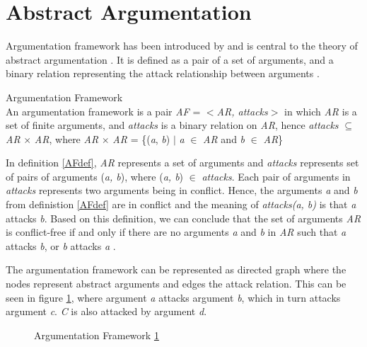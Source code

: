 \section{Abstract Argumentation} \label{abstractArgumentation}
Argumentation framework has been introduced by \citet{dung1995} and is central to the theory of abstract argumentation \citep{baroni2011introduction}. It is defined as a pair of a set of arguments, and a binary relation representing the attack relationship between arguments \citep{dung1995}. 

\theoremstyle{definition}
\begin{definition}{Argumentation Framework}
\label{AFdef}\\
An argumentation framework is a pair \textit{AF} = $<$\textit{AR, attacks}$>$ in which \textit{AR} is a set of finite arguments, and \textit{attacks} is a binary relation on \textit{AR}, hence \textit{attacks} $\subseteq$ \textit{AR} $\times$ \textit{AR}, where \textit{AR} $\times$ \textit{AR} = \{(\textit{a}, \textit{b}) $\vert$ \textit{a} $\in$ \textit{AR} and \textit{b} $\in$ \textit{AR}\}
\end{definition}

In definition \ref{AFdef}, \textit{AR} represents a set of arguments and \textit{attacks} represents set of pairs of arguments (\textit{a, b}), where (\textit{a, b}) $\in$ \textit{attacks}. Each pair of arguments in \textit{attacks} represents two arguments being in conflict. Hence, the arguments \textit{a} and \textit{b} from definistion \ref{AFdef} are in conflict and the meaning of \textit{attacks(a, b)} is that \textit{a} attacks \textit{b}. Based on this definition, we can conclude that the set of arguments \textit{AR} is conflict-free if and only if there are no arguments \textit{a} and \textit{b} in \textit{AR} such that \textit{a} attacks \textit{b}, or \textit{b} attacks \textit{a} \citep{dung1995}.

The argumentation framework can be represented as directed graph where the nodes represent abstract arguments and edges the attack relation. This can be seen in figure \ref{fig:argumentationFrameworkFigure}, where argument \textit{a} attacks argument \textit{b}, which in turn attacks argument \textit{c}. \textit{C} is also attacked by argument \textit{d}.
\newpage
\begin{figure}[h]
\centering
{}
\caption{Argumentation Framework \ref{fig:argumentationFrameworkFigure}}
\label{fig:argumentationFrameworkFigure}
\end{figure}
 
